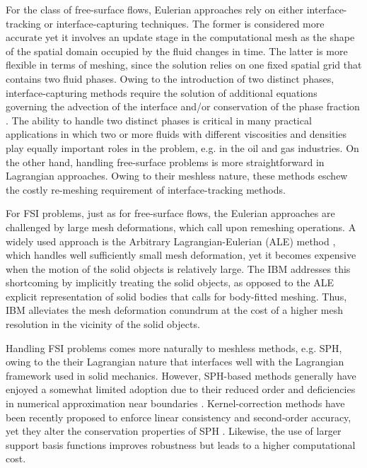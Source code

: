 \documentclass[final,3p,times]{elsarticle}
\begin{document}
For the class of free-surface flows, Eulerian approaches rely on either interface-tracking or interface-capturing techniques. The former is considered more accurate yet it involves an update stage in the computational mesh as the shape of the spatial domain occupied by the fluid changes in time. The latter is more flexible in terms of meshing, since the solution relies on one fixed spatial grid that contains two fluid phases. Owing to the introduction of two distinct phases, interface-capturing methods require the solution of additional equations governing the advection of the interface and/or conservation of the phase fraction \cite{tezduyar2006interface,Hirt1981,SSO94,SP00}. The ability to handle two distinct phases is critical in many practical applications in which two or more fluids with different viscosities and densities play equally important roles in the problem, e.g. in the oil and gas industries. On the other hand, handling free-surface problems is more straightforward in Lagrangian approaches. Owing to their meshless nature, these methods eschew the costly re-meshing requirement of interface-tracking methods.  

For FSI problems, just as for free-surface flows, the Eulerian approaches are challenged by large mesh deformations, which call upon remeshing operations. A widely used approach is the Arbitrary Lagrangian-Eulerian (ALE) method \cite{ALE1974}, which handles well sufficiently small mesh deformation, yet it becomes expensive when the motion of the solid objects is relatively large. The IBM \cite{Peskin1977} addresses this shortcoming by implicitly treating the solid objects, as opposed to the ALE explicit representation of solid bodies that calls for body-fitted meshing. Thus, IBM alleviates the mesh deformation conundrum at the cost of a higher mesh resolution in the vicinity of the solid objects. 

Handling FSI problems comes more naturally to meshless methods, e.g. SPH, owing to the their Lagrangian nature that interfaces well with the Lagrangian framework used in solid mechanics. However, SPH-based methods generally have enjoyed a somewhat limited adoption due to their reduced order and deficiencies in numerical approximation near boundaries \cite{trask2016compact}. Kernel-correction methods have been recently proposed to enforce linear consistency and second-order accuracy, yet they alter the conservation properties of SPH \cite{fatehi2011,Libersky1993,randles1996,trask_highly-scalable_2015,islam2018consistency}. Likewise, the use of larger support basis functions improves robustness but leads to a higher computational cost.
\end{document}
